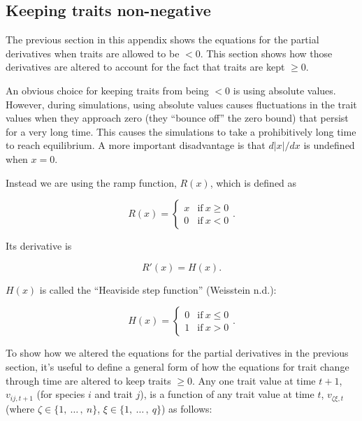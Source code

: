 \subsection*{Keeping traits non-negative}


The previous section in this appendix shows the equations for the
partial derivatives when traits are allowed to be $<0$.
This section shows how those derivatives are altered to account for
the fact that traits are kept $\ge 0$.


An obvious choice for keeping traits from being $<0$ is using absolute
values.
However, during simulations, using absolute values causes fluctuations
in the trait values when they approach zero (they ``bounce off''
the zero bound) that persist for a very long time.
This causes the simulations to take a prohibitively long time to reach
equilibrium.
A more important disadvantage is that $d \lvert x \rvert / dx$ is
undefined when $x = 0$.


Instead we are using the ramp function, $R(x)$, which is defined as

\begin{equation*}
    R(x) = \begin{cases}
        x & \text{if}\ x \ge 0 \\
        0 & \text{if}\ x < 0
        \end{cases}
    \text{.}
\end{equation*}


\noindent Its derivative is

\begin{equation*}
    R'(x) = H(x).
\end{equation*}

\noindent $H(x)$ is called the ``Heaviside step function'' (Weisstein n.d.):

\begin{equation*}
    H(x) = \begin{cases}
        0 & \text{if}\ x \le 0 \\
        1 & \text{if}\ x > 0
        \end{cases}
    \text{.}
\end{equation*}



To show how we altered the equations for the partial derivatives
in the previous section, it's useful to define a general form of how
the equations for trait change through time are altered to keep traits $\ge 0$.
Any one trait value at time $t+1$,
$v_{ij,t+1}$ (for species $i$ and trait $j$),
is a function of any trait value at time $t$, $v_{\zeta\xi,t}$
(where $\zeta \in \{ 1, \: \ldots \, , \: n \}$,
$\xi \in \{ 1, \: \ldots \, , \: q \}$)
as follows:

